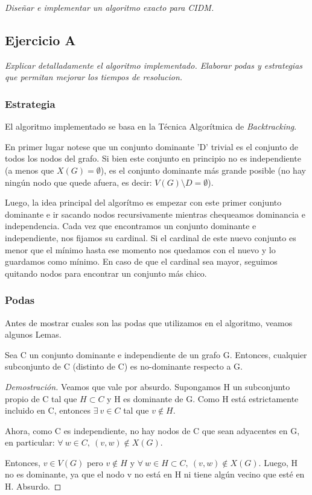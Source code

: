 \textit{Diseñar e implementar un algoritmo exacto para CIDM.}

\subsection{Ejercicio A}

\textit{Explicar detalladamente el algoritmo implementado. Elaborar podas y estrategias que permitan mejorar los tiempos de resolucion.}

\medskip

\subsubsection{Estrategia}
El algoritmo implementado se basa en la Técnica Algorítmica de \textit{Backtracking}.

En primer lugar notese que un conjunto dominante 'D' trivial es el conjunto de todos los nodos del grafo. Si bien este conjunto en principio no es independiente (a menos que $X(G) = \emptyset$), es el conjunto dominante más grande posible (no hay ningún nodo que quede afuera, es decir: $V(G) \setminus D = \emptyset$).

Luego, la idea principal del algorítmo es empezar con este primer conjunto dominante e ir sacando nodos recursivamente mientras chequeamos dominancia e independencia. Cada vez que encontramos un conjunto dominante e independiente, nos fijamos su cardinal. Si el cardinal de este nuevo conjunto es menor que el mínimo hasta ese momento nos quedamos con el nuevo y lo guardamos como mínimo. En caso de que el cardinal sea mayor, seguimos quitando nodos para encontrar un conjunto más chico.

\subsubsection{Podas}

Antes de mostrar cuales son las podas que utilizamos en el algoritmo, veamos algunos Lemas.

    \begin{lemma}
        Sea C un conjunto dominante e independiente de un grafo G. Entonces, cualquier subconjunto de C (distinto de C) es no-dominante respecto a G.
    \end{lemma}
    \begin{proof}[Demostración]
        Veamos que vale por absurdo. Supongamos H un subconjunto propio de C tal que $H \subset C$ y H es dominante de G. Como H está estrictamente incluido en C, entonces $\exists\ v \in C$ tal que $v \notin H$.

        Ahora, como C es independiente, no hay nodos de C que sean adyacentes en G, en particular: $\forall\ w \in C,\ (v,w) \notin X(G)$.

        Entonces, $v \in V(G)$ pero $v \notin H$ y $\forall\ w \in H \subset C,\ (v,w) \notin X(G)$. Luego, H no es dominante, ya que el nodo v no está en H ni tiene algún vecino que esté en H. Absurdo.
    \end{proof}

